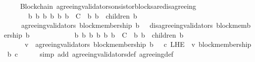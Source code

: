 \begin{isabellebody}
\ \ \isamarkupfalse%
%
\endisatagproof
{\isafoldproof}%
%
\isadelimproof
\isanewline
%
\endisadelimproof
\isanewline
{}\isamarkupfalse%
\ {\isacharparenleft}\ Blockchain{\isacharparenright}\ agreeing{\isacharunderscore}validators{\isacharunderscore}on{\isacharunderscore}sistor{\isacharunderscore}blocks{\isacharunderscore}are{\isacharunderscore}disagreeing\ {\isacharcolon}\isanewline
\ \ {\isachardoublequoteopen}{\isasymforall}\ {\isasymsigma}\ {\isasymin}\ {\isasymSigma}{\isachardot}\ {\isasymforall}\ b\ b{}\ b{}{\isachardot}\ {\isacharbraceleft}b{\isacharcomma}\ b{}{\isacharcomma}\ b{}{\isacharbraceright}\ {\isasymsubseteq}\ C\ {\isasymand}\ {\isacharbraceleft}b{}{\isacharcomma}\ b{}{\isacharbraceright}\ {\isasymsubseteq}\ children\ {\isacharparenleft}b{\isacharcomma}\ {\isasymsigma}{\isacharparenright}\ \isanewline
\ \ \ {\isasymlongrightarrow}\ \ agreeing{\isacharunderscore}validators\ {\isacharparenleft}block{\isacharunderscore}membership\ b{}{\isacharcomma}\ {\isasymsigma}{\isacharparenright}\ {\isasymsubseteq}\ disagreeing{\isacharunderscore}validators\ {\isacharparenleft}block{\isacharunderscore}membership\ b{}{\isacharcomma}\ {\isasymsigma}{\isacharparenright}{\isachardoublequoteclose}\isanewline
%
\isadelimproof
%
\endisadelimproof
%
\isatagproof
{}\isamarkupfalse%
\ {\isacharminus}\ \isanewline
\ \ \isamarkupfalse%
\ {\isachardoublequoteopen}{\isasymforall}\ {\isasymsigma}\ {\isasymin}\ {\isasymSigma}{\isachardot}\ {\isasymforall}\ b\ b{}\ b{}{\isachardot}\ {\isacharbraceleft}b{\isacharcomma}\ b{}{\isacharcomma}\ b{}{\isacharbraceright}\ {\isasymsubseteq}\ C\ {\isasymand}\ {\isacharbraceleft}b{}{\isacharcomma}\ b{}{\isacharbraceright}\ {\isasymsubseteq}\ children\ {\isacharparenleft}b{\isacharcomma}\ {\isasymsigma}{\isacharparenright}\ \isanewline
\ \ \ {\isasymlongrightarrow}\ \ {\isacharparenleft}{\isasymforall}\ v\ {\isasymin}\ agreeing{\isacharunderscore}validators\ {\isacharparenleft}block{\isacharunderscore}membership\ b{}{\isacharcomma}\ {\isasymsigma}{\isacharparenright}{\isachardot}\ {\isasymforall}\ c\ {\isasymin}L{\isacharunderscore}H{\isacharunderscore}E\ {\isasymsigma}\ v{\isachardot}\ block{\isacharunderscore}membership\ b{}\ c{\isacharparenright}{\isachardoublequoteclose}\isanewline
\ \ \ \ \isamarkupfalse%
\ {\isacharparenleft}simp\ add{\isacharcolon}\ agreeing{\isacharunderscore}validators{\isacharunderscore}def\ agreeing{\isacharunderscore}def{\isacharparenright}\isanewline

\end{isabellebody}
